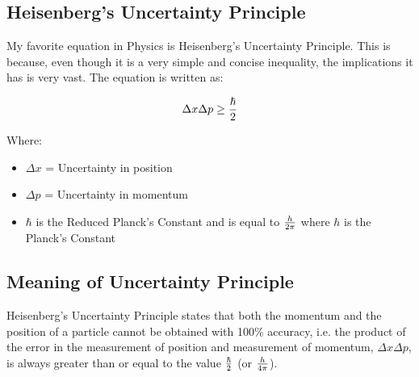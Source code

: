 \subsection{Heisenberg's Uncertainty Principle}
{
    My favorite equation in Physics is Heisenberg's Uncertainty Principle. This is because, even though it is a very simple and concise inequality, the implications it has is very vast. The equation is written as:

    \begin{equation}
        \Delta x \Delta p \geq {\hbar \over 2} 
        \label{Uncertainty Principle}
    \end{equation}
}
Where:
\begin{itemize}
    \item $\Delta x$ = Uncertainty in position
    \item $\Delta p$ = Uncertainty in momentum 
    \item $\hbar$ is the Reduced Planck's Constant and is equal to $h \over 2\pi$ where $h$ is the Planck's Constant
\end{itemize}

\subsection{Meaning of Uncertainty Principle}
{
    Heisenberg's Uncertainty Principle states that both the momentum and the position of a particle cannot be obtained with 100\% accuracy, i.e. the product of the error in the measurement of position and measurement of momentum, $\Delta x \Delta p$, is always greater than or equal to the value $\hbar \over 2$ (or $h \over 4\pi$).
}
